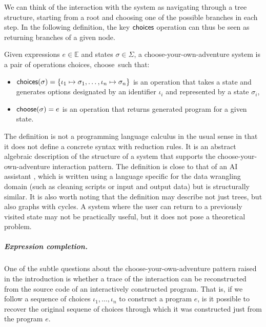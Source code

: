 \documentclass[anonymous, a4paper,UKenglish,cleveref, autoref, thm-restate]{lipics-v2021}
\newcommand{\ident}[1]{\textsf{#1}}
\newcommand{\select}{\textnormal{\ident{choose}}}
\newcommand{\choices}{\textnormal{\ident{choices}}}
\begin{document}
We can think of the interaction with the system as navigating through a tree structure, starting
from a root and choosing one of the possible branches in each step. %
In the following definition, the key $\choices$ operation can thus be seen as returning
branches of a given node.

\begin{definition}\label{def:calculus}
Given expressions $e\in \mathbb{E}$ and states $\sigma \in \Sigma$, a choose-your-own-adventure
system is a pair of operations \choices, \select\ such that:

\vspace{-0.5em}
\raggedright
\begin{itemize}
  \item $\choices(\sigma) = \{\iota_1\mapsto\sigma_1, \ldots, \iota_n\mapsto\sigma_n\}$ is
    an operation that takes a state and \\ generates options designated by an identifier $\iota_i$
    and represented by a state $\sigma_i$,
  \item $\select(\sigma) = e$ is an operation that returns generated program for a given state.
\end{itemize}
\end{definition}

The definition is not a programming language calculus in the usual sense in that it does not
define a concrete syntax with reduction rules. It is an abstract algebraic description of
the structure of a system that supports the choose-your-own-adventure interaction pattern.
The definition is close to that of an AI assistant \cite{petricek-2023-aias}, which is written
using a language specific for the data wrangling domain (such as cleaning scripts or input and
output data) but is structurally similar. It is also worth noting that the definition may describe
not just trees, but also graphs with cycles. A system where the user can return to a previously
visited state may not be practically useful, but it does not pose a theoretical problem.


\subparagraph{Expression completion.}
One of the subtle questions about the choose-your-own-adventure pattern raised in the introduction
is whether a trace of the interaction can be reconstructed from the source code of an interactively
constructed program. That is, if we follow a sequence of choices $\iota_1, \ldots, \iota_n$ to
construct a program $e$, is it possible to recover the original sequene of choices through which
it was constructed just from the program $e$.
\end{document}
